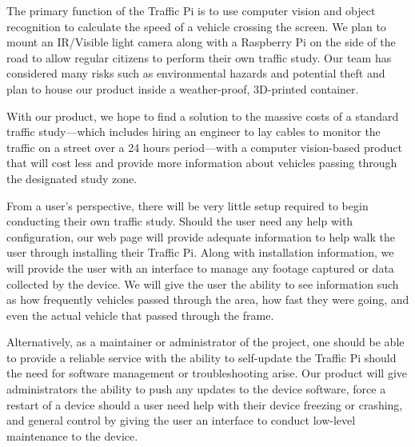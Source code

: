 \setlength{\parskip}{0.5em}
\noindent The primary function of the Traffic Pi is to use computer vision and object recognition to calculate the speed of a vehicle crossing the screen. We plan to mount an IR/Visible light camera along with a Raspberry Pi on the side of the road to allow regular citizens to perform their own traffic study. Our team has considered many risks such as environmental hazards and potential theft and plan to house our product inside a weather-proof, 3D-printed container.

\noindent With our product, we hope to find a solution to the massive costs of a standard traffic study—which includes hiring an engineer to lay cables to monitor the traffic on a street over a 24 hours period—with a computer vision-based product that will cost less and provide more information about vehicles passing through the designated study zone.

\noindent From a user's perspective, there will be very little setup required to begin conducting their own traffic study. Should the user need any help with configuration, our web page will provide adequate information to help walk the user through installing their Traffic Pi. Along with installation information, we will provide the user with an interface to manage any footage captured or data collected by the device. We will give the user the ability to see information such as how frequently vehicles passed through the area, how fast they were going, and even the actual vehicle that passed through the frame.

\noindent Alternatively, as a maintainer or administrator of the project, one should be able to provide a reliable service with the ability to self-update the Traffic Pi should the need for software management or troubleshooting arise. Our product will give administrators the ability to push any updates to the device software, force a restart of a device should a user need help with their device freezing or crashing, and general control by giving the user an interface to conduct low-level maintenance to the device. \par

